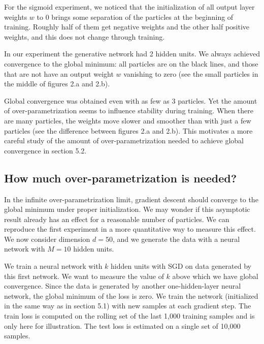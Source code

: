 \documentclass[a4paper, 11pt]{scrartcl}
\begin{document}
{For the sigmoid experiment, we noticed that the initialization of all output layer weights $w$ to 0 brings some separation of the particles at the beginning of training. Roughly half of them get negative weights and the other half positive weights, and this does not change through training.

In our experiment the generative network had 2 hidden units. We always achieved convergence to the global minimum: all particles are on the black lines, and those that are not have an output weight $w$ vanishing to zero (see the small particles in the middle of figures 2.a and 2.b).


Global convergence was obtained even with as few as 3 particles. Yet the amount of over-parametrization seems to influence stability during training. When there are many particles, the weights move slower and smoother than with just a few particles (see the difference between figures 2.a and 2.b). This motivates a more careful study of the amount of over-parametrization needed to achieve global convergence in section 5.2.

\subsection{How much over-parametrization is needed?}

In the infinite over-parametrization limit, gradient descent should converge to the global minimum under proper initialization. We may wonder if this asymptotic result already has an effect for a reasonable number of particles. We can reproduce the first experiment in a more quantitative way to measure this effect. We now consider dimension $d=50$, and we generate the data with a neural network with $M=10$ hidden units.

We train a neural network with $k$ hidden units with SGD on data generated by this first network. We want to measure the value of $k$ above which we have global convergence. Since the data is generated by another one-hidden-layer neural network, the global minimum of the loss is zero. We train the network (initialized in the same way as in section 5.1) with new samples at each gradient step. The train loss is computed on the rolling set of the last 1,000 training samples and is only here for illustration. The test loss is estimated on a single set of 10,000 samples.


}
\end{document}
